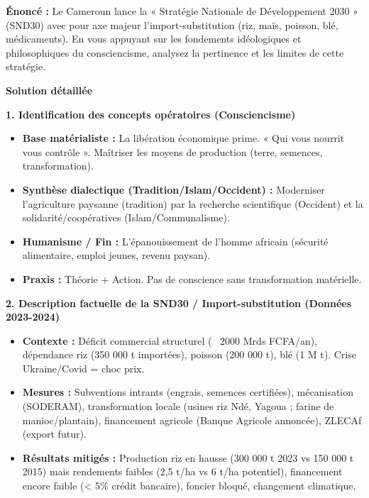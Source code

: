 \documentclass[11pt]{article}
\begin{document}
\begin{exoresolu}
\textbf{Énoncé :} Le Cameroun lance la « Stratégie Nationale de Développement 2030 » (SND30) avec pour axe majeur l'import-substitution (riz, maïs, poisson, blé, médicaments). En vous appuyant sur les fondements idéologiques et philosophiques du consciencisme, analysez la pertinence et les limites de cette stratégie.

\tcblower
\textbf{Solution détaillée}

\textbf{1. Identification des concepts opératoires (Consciencisme)}
\begin{itemize}
    \item \textbf{Base matérialiste :} La libération économique prime. « Qui vous nourrit vous contrôle ». Maîtriser les moyens de production (terre, semences, transformation).
    \item \textbf{Synthèse dialectique (Tradition/Islam/Occident) :} Moderniser l'agriculture paysanne (tradition) par la recherche scientifique (Occident) et la solidarité/coopératives (Islam/Communalisme).
    \item \textbf{Humanisme / Fin :} L'épanouissement de l'homme africain (sécurité alimentaire, emploi jeunes, revenu paysan).
    \item \textbf{Praxis :} Théorie + Action. Pas de conscience sans transformation matérielle.
\end{itemize}

\textbf{2. Description factuelle de la SND30 / Import-substitution (Données 2023-2024)}
\begin{itemize}
    \item \textbf{Contexte :} Déficit commercial structurel (~ 2000 Mrds FCFA/an), dépendance riz (350 000 t importées), poisson (200 000 t), blé (1 M t). Crise Ukraine/Covid = choc prix.
    \item \textbf{Mesures :} Subventions intrants (engrais, semences certifiées), mécanisation (SODERAM), transformation locale (usines riz Ndé, Yagoua ; farine de manioc/plantain), financement agricole (Banque Agricole annoncée), ZLECAf (export futur).
    \item \textbf{Résultats mitigés :} Production riz en hausse (300 000 t 2023 vs 150 000 t 2015) mais rendements faibles (2,5 t/ha vs 6 t/ha potentiel), financement encore faible (< 5\% crédit bancaire), foncier bloqué, changement climatique.
\end{itemize}


\end{exoresolu}
\end{document}
